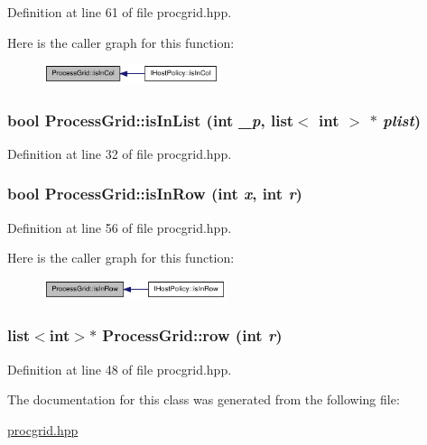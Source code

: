 Definition at line 61 of file procgrid.hpp.

Here is the caller graph for this function:\nopagebreak
\begin{figure}[H]
\begin{center}
\leavevmode
\includegraphics[width=146pt]{class_process_grid_ab8954e1d54e14023558d57dc2f84953c_icgraph}
\end{center}
\end{figure}
\hypertarget{class_process_grid_a37c4a3beb6bc5468816e1ec8df99f8d7}{
\subsubsection[{isInList}]{\setlength{\rightskip}{0pt plus 5cm}bool ProcessGrid::isInList (int {\em \_\-p}, \/  list$<$ int $>$ $\ast$ {\em plist})}}
\label{class_process_grid_a37c4a3beb6bc5468816e1ec8df99f8d7}


Definition at line 32 of file procgrid.hpp.\hypertarget{class_process_grid_afde8841687dc3c3a11c2c0a70104a512}{
\subsubsection[{isInRow}]{\setlength{\rightskip}{0pt plus 5cm}bool ProcessGrid::isInRow (int {\em x}, \/  int {\em r})}}
\label{class_process_grid_afde8841687dc3c3a11c2c0a70104a512}


Definition at line 56 of file procgrid.hpp.

Here is the caller graph for this function:\nopagebreak
\begin{figure}[H]
\begin{center}
\leavevmode
\includegraphics[width=152pt]{class_process_grid_afde8841687dc3c3a11c2c0a70104a512_icgraph}
\end{center}
\end{figure}
\hypertarget{class_process_grid_a2525f9b6d7307f6ca3d1db558e934550}{
\subsubsection[{row}]{\setlength{\rightskip}{0pt plus 5cm}list$<$int$>$$\ast$ ProcessGrid::row (int {\em r})}}
\label{class_process_grid_a2525f9b6d7307f6ca3d1db558e934550}


Definition at line 48 of file procgrid.hpp.

The documentation for this class was generated from the following file:\begin{DoxyCompactItemize}
\item 
\hyperlink{procgrid_8hpp}{procgrid.hpp}\end{DoxyCompactItemize}
